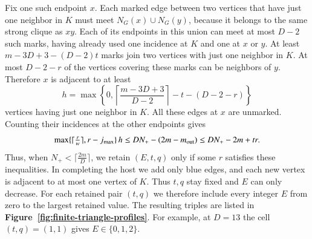 \documentclass[preprint,11pt,numbers]{elsarticle-arxiv}
\numberwithin{equation}{section}
\theoremstyle{definition}
\begin{document}
Fix one such endpoint $x$. Each marked edge between two vertices that
have just one neighbor in $K$ must meet $N_G(x)\cup N_G(y)$, because
it belongs to the same strong clique as $xy$. Each of its endpoints in
this union can meet at most $D-2$ such marks, having already used one
incidence at $K$ and one at $x$ or $y$. At least
$m-3D+3-(D-2)t$ marks join two vertices with just one neighbor in $K$.
At most $D-2-r$ of the vertices covering these marks can be neighbors of
$y$. Therefore $x$ is adjacent to at least
\[
 h=\max\left\{0,\left\lceil\frac{m-3D+3}{D-2}\right\rceil-t-(D-2-r)\right\}
\]
vertices having just one neighbor in $K$. All these edges at $x$
are unmarked. Counting their incidences at the other endpoints gives
\[
 \max\{\lceil\tfrac{r}{w}\rceil,r-j_{\max}\}\,h
 \le DN_+-(2m-m_{\rm out})\le DN_+-2m+tr .
\]
Thus, when $N_+<\lceil\frac{2m}{D}\rceil$, we retain $(E,t,q)$ only
if some $r$ satisfies these inequalities. In completing the host
we add only blue edges, and each new vertex is adjacent to at most
one vertex of $K$. Thus $t,q$ stay fixed and $E$ can only decrease.
For each retained pair $(t,q)$ we therefore include every integer $E$
from zero to the largest retained value. The resulting triples are
listed in \textbf{Figure~\ref{fig:finite-triangle-profiles}}. For example,
at $D=13$ the cell $(t,q)=(1,1)$ gives $E\in\{0,1,2\}$.
\end{document}
